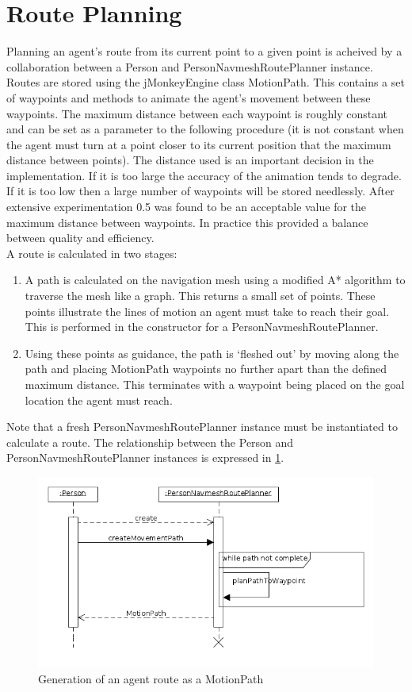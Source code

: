 %
\section{Route Planning}
\label{Imp:sec:routePlanning}
Planning an agent's route from its current point to a given point is acheived by a collaboration between a Person and PersonNavmeshRoutePlanner instance. Routes are stored using the jMonkeyEngine class MotionPath. This contains a set of waypoints and methods to animate the agent's movement between these waypoints. The maximum distance between each waypoint is roughly constant and can be set as a parameter to the following procedure (it is not constant when the agent must turn at a point closer to its current position that the maximum distance between points). The distance used is an important decision in the implementation. If it is too large the accuracy of the animation tends to degrade. If it is too low then a large number of waypoints will be stored needlessly. After extensive experimentation 0.5 was found to be an acceptable value for the maximum distance between waypoints. In practice this provided a balance between quality and efficiency.\\
A route is calculated in two stages:
\begin{enumerate}
\item{A path is calculated on the navigation mesh using a modified A* algorithm to traverse the mesh like a graph. This returns a small set of points. These points illustrate the lines of motion an agent must take to reach their goal. This is performed in the constructor for a PersonNavmeshRoutePlanner.}
\item{Using these points as guidance, the path is `fleshed out' by moving along the path and placing MotionPath waypoints no further apart than the defined maximum
distance. This terminates with a waypoint being placed on the goal location the agent must reach.}
\end{enumerate}
Note that a fresh PersonNavmeshRoutePlanner instance must be instantiated to calculate a route. The relationship between the Person and PersonNavmeshRoutePlanner instances is expressed in \ref{fig:RoutePlanSequence}.

\begin{figure}
\label{fig:RoutePlanSequence}
\centering
\includegraphics[scale=0.5]{../UMLDiagrams/RoutePlanningSequence.png}
\caption{Generation of an agent route as a MotionPath}
\end{figure}


